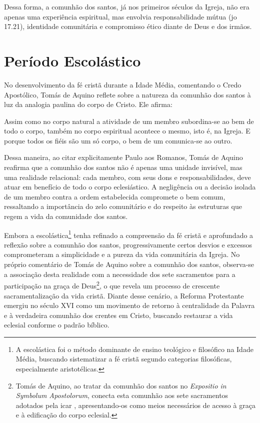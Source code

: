 Dessa forma, a comunhão dos santos, já nos primeiros séculos da Igreja, não era apenas uma experiência espiritual, mas envolvia responsabilidade mútua (\gls{jo} 17.21), identidade comunitária e compromisso ético diante de Deus e dos irmãos.

\section{Período Escolástico}

No desenvolvimento da fé cristã durante a Idade Média, comentando o Credo Apostólico, Tomás de Aquino reflete sobre a natureza da comunhão dos santos à luz da analogia paulina do corpo de Cristo. Ele afirma:

\begin{citacao}
    Assim como no corpo natural a atividade de um membro subordina-se ao bem de todo o corpo, também no corpo espiritual acontece o mesmo, isto é, na Igreja. E porque todos os fiéis são um só corpo, o bem de um comunica-se ao outro. \cite[p.~79]{aquinoCredo2004}
\end{citacao}

Dessa maneira, ao citar explicitamente Paulo aos Romanos, Tomás de Aquino reafirma que a comunhão dos santos não é apenas uma unidade invisível, mas uma realidade relacional: cada membro, com seus dons e responsabilidades, deve atuar em benefício de todo o corpo eclesiástico. A negligência ou a decisão isolada de um membro contra a ordem estabelecida compromete o bem comum, ressaltando a importância do zelo comunitário e do respeito às estruturas que regem a vida da comunidade dos santos.

Embora a escolástica\footnote{A escolástica foi o método dominante de ensino teológico e filosófico na Idade Média, buscando sistematizar a fé cristã segundo categorias filosóficas, especialmente aristotélicas.} tenha refinado a compreensão da fé cristã e aprofundado a reflexão sobre a comunhão dos santos, progressivamente certos desvios e excessos comprometeram a simplicidade e a pureza da vida comunitária da Igreja. No próprio comentário de Tomás de Aquino sobre a comunhão dos santos, observa-se a associação desta realidade com a necessidade dos sete sacramentos para a participação na graça de Deus\footnote{Tomás de Aquino, ao tratar da comunhão dos santos no \textit{\foreignlanguage{latin}{Expositio in Symbolum Apostolorum}}, conecta esta comunhão aos sete sacramentos adotados pela \gls{icar} \cite{aquinoCredo2004}, apresentando-os como meios necessários de acesso à graça e à edificação do corpo eclesial.}, o que revela um processo de crescente sacramentalização da vida cristã. Diante desse cenário, a Reforma Protestante emergiu no século XVI como um movimento de retorno à centralidade da Palavra e à verdadeira comunhão dos crentes em Cristo, buscando restaurar a vida eclesial conforme o padrão bíblico.


